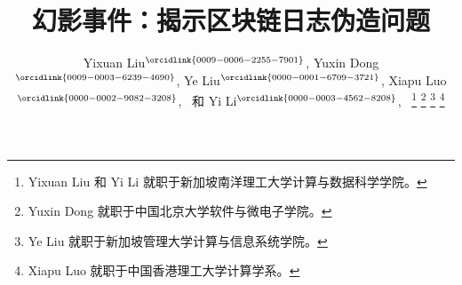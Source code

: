\documentclass[lettersize,journal]{IEEEtran}
\begin{document}
\title{幻影事件：揭示区块链日志伪造问题}

\author{
    Yixuan Liu$^{\orcidlink{0009-0006-2255-7901}}$, 
    Yuxin Dong$^{\orcidlink{0009-0003-6239-4690}}$,
    Ye Liu$^{\orcidlink{0000-0001-6709-3721}}$,
    Xiapu Luo$^{\orcidlink{0000-0002-9082-3208}}$,~
    和 Yi Li$^{\orcidlink{0000-0003-4562-8208}}$,~ \thanks{Yixuan Liu 和 Yi Li 就职于新加坡南洋理工大学计算与数据科学学院。}
    \thanks{Yuxin Dong 就职于中国北京大学软件与微电子学院。}
    \thanks{Ye Liu 就职于新加坡管理大学计算与信息系统学院。}
    \thanks{Xiapu Luo 就职于中国香港理工大学计算学系。}
    
}

\maketitle
\thispagestyle{fancy}



\IEEEpeerreviewmaketitle

















\end{document}
